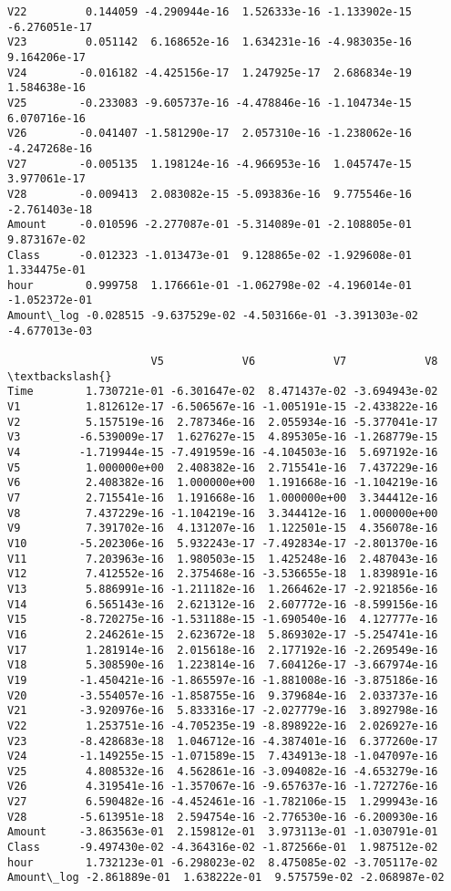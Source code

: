 \documentclass[11pt]{article}
\begin{document}
\begin{tcolorbox}[breakable, size=fbox, boxrule=.5pt, pad at break*=1mm, opacityfill=0]
\begin{Verbatim}[commandchars=\\\{\}]
V22         0.144059 -4.290944e-16  1.526333e-16 -1.133902e-15 -6.276051e-17
V23         0.051142  6.168652e-16  1.634231e-16 -4.983035e-16  9.164206e-17
V24        -0.016182 -4.425156e-17  1.247925e-17  2.686834e-19  1.584638e-16
V25        -0.233083 -9.605737e-16 -4.478846e-16 -1.104734e-15  6.070716e-16
V26        -0.041407 -1.581290e-17  2.057310e-16 -1.238062e-16 -4.247268e-16
V27        -0.005135  1.198124e-16 -4.966953e-16  1.045747e-15  3.977061e-17
V28        -0.009413  2.083082e-15 -5.093836e-16  9.775546e-16 -2.761403e-18
Amount     -0.010596 -2.277087e-01 -5.314089e-01 -2.108805e-01  9.873167e-02
Class      -0.012323 -1.013473e-01  9.128865e-02 -1.929608e-01  1.334475e-01
hour        0.999758  1.176661e-01 -1.062798e-02 -4.196014e-01 -1.052372e-01
Amount\_log -0.028515 -9.637529e-02 -4.503166e-01 -3.391303e-02 -4.677013e-03

                      V5            V6            V7            V8  \textbackslash{}
Time        1.730721e-01 -6.301647e-02  8.471437e-02 -3.694943e-02
V1          1.812612e-17 -6.506567e-16 -1.005191e-15 -2.433822e-16
V2          5.157519e-16  2.787346e-16  2.055934e-16 -5.377041e-17
V3         -6.539009e-17  1.627627e-15  4.895305e-16 -1.268779e-15
V4         -1.719944e-15 -7.491959e-16 -4.104503e-16  5.697192e-16
V5          1.000000e+00  2.408382e-16  2.715541e-16  7.437229e-16
V6          2.408382e-16  1.000000e+00  1.191668e-16 -1.104219e-16
V7          2.715541e-16  1.191668e-16  1.000000e+00  3.344412e-16
V8          7.437229e-16 -1.104219e-16  3.344412e-16  1.000000e+00
V9          7.391702e-16  4.131207e-16  1.122501e-15  4.356078e-16
V10        -5.202306e-16  5.932243e-17 -7.492834e-17 -2.801370e-16
V11         7.203963e-16  1.980503e-15  1.425248e-16  2.487043e-16
V12         7.412552e-16  2.375468e-16 -3.536655e-18  1.839891e-16
V13         5.886991e-16 -1.211182e-16  1.266462e-17 -2.921856e-16
V14         6.565143e-16  2.621312e-16  2.607772e-16 -8.599156e-16
V15        -8.720275e-16 -1.531188e-15 -1.690540e-16  4.127777e-16
V16         2.246261e-15  2.623672e-18  5.869302e-17 -5.254741e-16
V17         1.281914e-16  2.015618e-16  2.177192e-16 -2.269549e-16
V18         5.308590e-16  1.223814e-16  7.604126e-17 -3.667974e-16
V19        -1.450421e-16 -1.865597e-16 -1.881008e-16 -3.875186e-16
V20        -3.554057e-16 -1.858755e-16  9.379684e-16  2.033737e-16
V21        -3.920976e-16  5.833316e-17 -2.027779e-16  3.892798e-16
V22         1.253751e-16 -4.705235e-19 -8.898922e-16  2.026927e-16
V23        -8.428683e-18  1.046712e-16 -4.387401e-16  6.377260e-17
V24        -1.149255e-15 -1.071589e-15  7.434913e-18 -1.047097e-16
V25         4.808532e-16  4.562861e-16 -3.094082e-16 -4.653279e-16
V26         4.319541e-16 -1.357067e-16 -9.657637e-16 -1.727276e-16
V27         6.590482e-16 -4.452461e-16 -1.782106e-15  1.299943e-16
V28        -5.613951e-18  2.594754e-16 -2.776530e-16 -6.200930e-16
Amount     -3.863563e-01  2.159812e-01  3.973113e-01 -1.030791e-01
Class      -9.497430e-02 -4.364316e-02 -1.872566e-01  1.987512e-02
hour        1.732123e-01 -6.298023e-02  8.475085e-02 -3.705117e-02
Amount\_log -2.861889e-01  1.638222e-01  9.575759e-02 -2.068987e-02


\end{Verbatim}
\end{tcolorbox}
\end{document}

